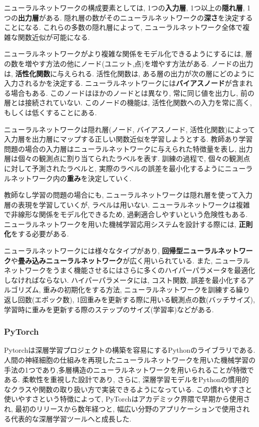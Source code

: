 \documentclass[dvipdfmx]{jsarticle}
\newcommand{\Add}[1]{\textcolor{red}{#1}}
\begin{document}
ニューラルネットワークの構成要素としては, 1つの\textbf{入力層}, 1つ以上の\textbf{隠れ層}, 1つの\textbf{出力層}がある.
隠れ層の数がそのニューラルネットワークの\textbf{深さ}を決定することになる.
これらの多数の隠れ層によって, ニューラルネットワーク全体で複雑な関数近似が可能になる.

ニューラルネットワークがより複雑な関係をモデル化できるようにするには, 層の数を増やす方法の他にノード(ユニット,点)を増やす方法がある.
ノードの出力は, \textbf{活性化関数}に与えられる.
活性化関数は, ある層の出力が次の層にどのように入力されるかを決定する.
ニューラルネットワークには\textbf{バイアスノード}が含まれる場合もある.
このノードはほかのノードとは異なり, 常に同じ値を出力し, 前の層とは接続されていない.
このノードの機能は, 活性化関数への入力を常に高く, もしくは低くすることにある.

ニューラルネットワークは隠れ層(ノード, バイアスノード, 活性化関数)によって入力層を出力層にマップする正しい関数近似を学習しようとする.
教師あり学習問題の場合の入力層はニューラルネットワークに与えられた特徴量を表し, 出力層は個々の観測点に割り当てられたラベルを表す.
訓練の過程で, 個々の観測点に対して予測されたラベルと, 実際のラベルの誤差を最小化するようにニューラルネットワーク内の\textbf{重み}を決定していく.

教師なし学習の問題の場合にも, ニューラルネットワークは隠れ層を使って入力層の表現を学習していくが, ラベルは用いない.
ニューラルネットワークは複雑で非線形な関係をモデル化できるため, 過剰適合しやすいという危険性もある.
ニューラルネットワークを用いた機械学習応用システムを設計する際には, \textbf{正則化}をする必要がある.

ニューラルネットワークには様々なタイプがあり, \textbf{回帰型ニューラルネットワーク}や\textbf{畳み込みニューラルネットワーク}が広く用いられている.
また, ニューラルネットワークをうまく機能させるにはさらに多くのハイパーパラメータを最適化しなければならない.
ハイパーパラメータには, コスト関数, 誤差を最小化するアルゴリズム, 重みの初期化をする方法, ニューラルネットワークを訓練する繰り返し回数(エポック数), 1回重みを更新する際に用いる観測点の数(バッチサイズ), 学習時に重みを更新する際のステップのサイズ(学習率)などがある.

\subsubsection{PyTorch}
Pytorchは深層学習プロジェクトの構築を容易にするPythonのライブラリである.
人間の神経細胞の仕組みを再現したニューラルネットワークを用いた機械学習の手法の1つであり,多層構造のニューラルネットワークを用いられることが特徴である.
柔軟性を重視した設計であり, さらに, 深層学習モデルをPythonの慣用的なクラスや関数の取り扱い方で実装できるようになっている.
この慣れやすさと使いやすさという特徴によって, PyTorchはアカデミック界隈で早期から使用され, 最初のリリースから数年経つと, 幅広い分野のアプリケーションで使用される代表的な深層学習ツールへと成長した.
\end{document}
